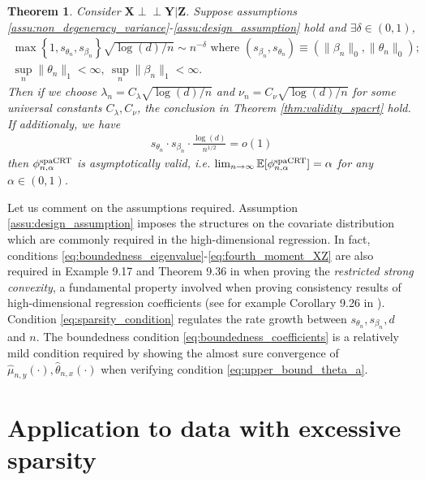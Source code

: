 \documentclass[12pt]{article}
\newtheorem{theorem}{Theorem}
\theoremstyle{definition}
\newcommand{\indep}{\perp \!\!\! \perp}
\newcommand{\E}{\mathbb E}								%
\newcommand{\prx}{\bm X}								%
\newcommand{\prz}{\bm Z}								%
\newcommand{\pry}{{\bm Y}}								%
\newcommand{\spacrt}{\textnormal{spaCRT}}               %
\begin{document}
  \begin{theorem}\label{thm:high_dim_glm_spacrt}
	Consider $\prx\indep\pry|\prz$. Suppose assumptions \ref{assu:non_degeneracy_variance}-\ref{assu:design_assumption} hold and $\exists\delta\in(0,1)$,
	\begin{align}
	  \max\left\{1,s_{\theta_n},s_{\beta_n}\right\} \sqrt{\log(d)/n}\sim n^{-\delta}\text{ where }(s_{\beta_n},s_{\theta_n})\equiv (\|\beta_n\|_0,\|\theta_n\|_0);\label{eq:sparsity_condition}\\
	  \sup_n\|\theta_n\|_1<\infty,\ \sup_n\|\beta_n\|_1<\infty.\label{eq:boundedness_coefficients}
	\end{align}
	Then if we choose $\lambda_n=C_{\lambda} \sqrt{\log(d)/n}$ and $\nu_n=C_{\nu}\sqrt{\log(d)/n}$ for some universal constants $C_\lambda,C_\nu$, the conclusion in Theorem \ref{thm:validity_spacrt} hold. If additionaly, we have 
	\begin{align}\label{eq:product_sparsity_condition}
	  s_{\theta_n}\cdot s_{\beta_n}\cdot \frac{\log(d)}{n^{1/2}}=o(1)
	\end{align}
	then $\phi_{n,\alpha}^\mathrm{\spacrt}$ is asymptotically valid, i.e. $\lim_{n\rightarrow\infty}\E[\phi_{n,\alpha}^{\spacrt}]=\alpha$ for any $\alpha\in(0,1)$. 
  \end{theorem}
  
  Let us comment on the assumptions required. Assumption \ref{assu:design_assumption} imposes the structures on the covariate distribution which are commonly required in the high-dimensional regression. In fact, conditions \eqref{eq:boundedness_eigenvalue}-\eqref{eq:fourth_moment_XZ} are also required in Example 9.17 and Theorem 9.36 in \citet{wainwright2019high} when proving the \textit{restricted strong convexity}, a fundamental property involved when proving consistency results of high-dimensional regression coefficients (see for example Corollary 9.26 in \citet{wainwright2019high}). Condition \eqref{eq:sparsity_condition} regulates the rate growth between $s_{\theta_n},s_{\beta_n},d$ and $n$. The boundedness condition \eqref{eq:boundedness_coefficients} is a relatively mild condition required by showing the almost sure convergence of $\widehat{\mu}_{n,y}(\cdot), \widehat{\theta}_{n,x}(\cdot)$ when verifying condition \eqref{eq:upper_bound_theta_a}.
  
  
  \section{Application to data with excessive sparsity}\label{sec:simulation} 
  
\end{document}
